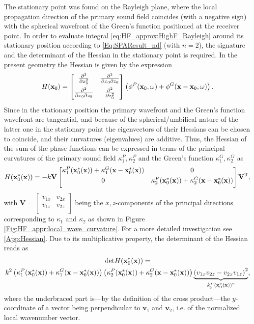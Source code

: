 The stationary point was found on the Rayleigh plane, where the local propagation direction of the primary sound field coincides (with a negative sign) with the spherical wavefront of the Green's function positioned at the receiver point. 
In order to evaluate integral \eqref{eq:HF_approx:HighF_Rayleigh} around its stationary position according to \eqref{Eq:SPAResult_nd} (with $n=2$), the signature and the determinant of the Hessian in the stationary point is required.
In the present geometry the Hessian is given by the expression
\begin{equation}
H(\mathbf{x}_0) =
\begin{bmatrix} 
\frac{\partial^2}{\partial x_0^2} & \frac{\partial^2}{\partial x_0 \partial z_0} \\[.7em]
\frac{\partial^2}{\partial x_0 \partial z_0} & \frac{\partial^2}{\partial z_0^2}\\[0.5em] \end{bmatrix} 
\left( \phi^P(\mathbf{x}_0,\omega) + \phi^G(\mathbf{x}-\mathbf{x}_0,\omega)  \right).
\end{equation}
Since in the stationary position the primary wavefront and the Green's function wavefront are tangential, and because of the spherical/umbilical nature of the latter one in the stationary point the eigenvectors of their Hessians can be chosen to coincide, and their curvatures (eigenvalues) are additive.
Thus, the Hessian of the sum of the phase functions can be expressed in terms of the principal curvatures of the primary sound field $\kappa_1^P, \kappa_2^P$ and the Green's function $\kappa_1^G, \kappa_2^G$ as
\begin{equation}
H(\mathbf{x}_0^*(\mathbf{x})) = -k
\mathbf{V}
\begin{bmatrix} 
\kappa_1^P(\mathbf{x}_0^*(\mathbf{x})) + \kappa_1^G(\mathbf{x}-\mathbf{x}_0^*(\mathbf{x})) & 0 \\[.3em]
0 & \kappa_2^P(\mathbf{x}_0^*(\mathbf{x})) + \kappa_2^G(\mathbf{x}-\mathbf{x}_0^*(\mathbf{x})) \\[.5em] \end{bmatrix}
\mathbf{V}^{\mathrm{T}},
\end{equation}
with $\mathbf{V} = \begin{bmatrix} 
v_{1 x} & v_{2 x} \\[.1em]
v_{1 z} & v_{2 z}\\[.3em] \end{bmatrix}$ being the $x,z$-components of the principal directions corresponding to $\kappa_1$ and $\kappa_2$ as shown in Figure \ref{Fig:HF_appr:local_wave_curvature}.
For a more detailed investigation see \ref{App:Hessian}.
Due to its multiplicative property, the determinant of the Hessian reads as
\begin{multline}
\label{Eq:HF_approx:H_det_Rayleigh}
\small
\mathrm{det} H(\mathbf{x}_0^*(\mathbf{x})) = \\ k^2
\left(\kappa_1^P(\mathbf{x}_0^*(\mathbf{x})) + \kappa_1^G(\mathbf{x}-\mathbf{x}_0^*(\mathbf{x}))\right)
\left(\kappa_2^P(\mathbf{x}_0^*(\mathbf{x})) + \kappa_2^G(\mathbf{x}-\mathbf{x}_0^*(\mathbf{x}))\right)
\underbrace{\left( v_{1 x}v_{2 z}-v_{2 x}v_{1 z} \right)^2}_{\hat{k}_y^P(\mathbf{x}_0^*(\mathbf{x}))^2},
\end{multline}
where the underbraced part is---by the definition of the cross product---the $y$-coordinate of a vector being perpendicular to $\mathbf{v}_1$ and $\mathbf{v}_2$, i.e. of the normalized local wavenumber vector.

